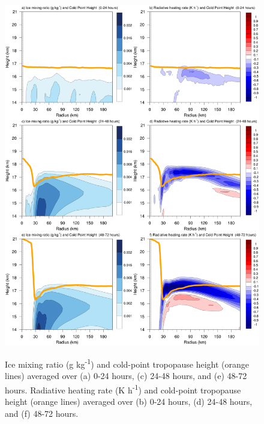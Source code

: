 \documentclass{ametsoc}
\begin{document}
\begin{figure}[ht]
\centerline{\includegraphics[width=39pc]{qi+radten.png}}
\end{figure}
\begin{figure}
\caption{Ice mixing ratio (g kg\textsuperscript{-1}) and cold-point tropopause height (orange lines) averaged over (a) 0-24 hours, (c) 24-48 hours, and (e) 48-72 hours. Radiative heating rate (K h\textsuperscript{-1}) and cold-point tropopause height (orange lines) averaged over (b) 0-24 hours, (d) 24-48 hours, and (f) 48-72 hours.} 
\label{fig:qi+radten}
\end{figure}
\end{document}
